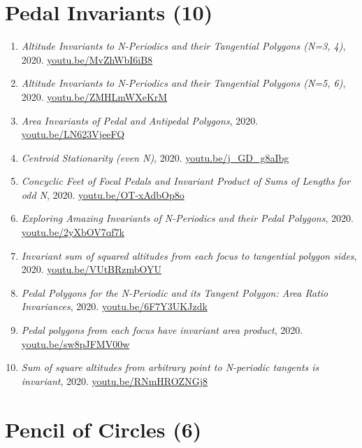 \documentclass[12pt]{article}
\begin{document}
\section{Pedal Invariants (10)}

\begin{enumerate}[resume]
\item \textit{Altitude Invariants to N-Periodics and their Tangential Polygons (N=3, 4)}, 2020. \href{https://youtu.be/MvZhWbI6iB8}{\url{youtu.be/MvZhWbI6iB8}}
\item \textit{Altitude Invariants to N-Periodics and their Tangential Polygons (N=5, 6)}, 2020. \href{https://youtu.be/ZMHLmWXeKrM}{\url{youtu.be/ZMHLmWXeKrM}}
\item \textit{Area Invariants of Pedal and Antipedal Polygons}, 2020. \href{https://youtu.be/LN623VjeeFQ}{\url{youtu.be/LN623VjeeFQ}}
\item \textit{Centroid Stationarity (even N)}, 2020. \href{https://youtu.be/j_GD_g8aIbg}{\url{youtu.be/j\_GD\_g8aIbg}}
\item \textit{Concyclic Feet of Focal Pedals and Invariant Product of Sums of Lengths for odd N}, 2020. \href{https://youtu.be/OT-xAdbOp8o}{\url{youtu.be/OT-xAdbOp8o}}
\item \textit{Exploring Amazing Invariants of N-Periodics and their Pedal Polygons}, 2020. \href{https://youtu.be/2yXbOV7qf7k}{\url{youtu.be/2yXbOV7qf7k}}
\item \textit{Invariant sum of squared altitudes from each focus to tangential polygon sides}, 2020. \href{https://youtu.be/VUtBRzmbOYU}{\url{youtu.be/VUtBRzmbOYU}}
\item \textit{Pedal Polygons for the N-Periodic and its Tangent Polygon: Area Ratio Invariances}, 2020. \href{https://youtu.be/6F7Y3UKJzdk}{\url{youtu.be/6F7Y3UKJzdk}}
\item \textit{Pedal polygons from each focus have invariant area product}, 2020. \href{https://youtu.be/sw8pJFMV00w}{\url{youtu.be/sw8pJFMV00w}}
\item \textit{Sum of square altitudes from arbitrary point to N-periodic tangents is invariant}, 2020. \href{https://youtu.be/RNmHROZNGj8}{\url{youtu.be/RNmHROZNGj8}}
\end{enumerate}

\section{Pencil of Circles (6)}
\end{document}
